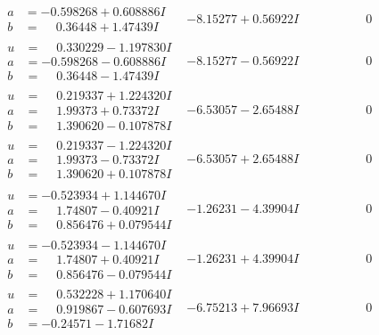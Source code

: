 \documentclass[1p]{elsarticle_modified}
\theoremstyle{definition}
\begin{document}
$$\begin{array}{c|c|c}
\begin{aligned}
a &= -0.598268 + 0.608886 I \\
b &= \phantom{-}0.36448 + 1.47439 I\end{aligned}
 & -8.15277 + 0.56922 I & \phantom{-0.000000 } 0 \\ \hline\begin{aligned}
u &= \phantom{-}0.330229 - 1.197830 I \\
a &= -0.598268 - 0.608886 I \\
b &= \phantom{-}0.36448 - 1.47439 I\end{aligned}
 & -8.15277 - 0.56922 I & \phantom{-0.000000 } 0 \\ \hline\begin{aligned}
u &= \phantom{-}0.219337 + 1.224320 I \\
a &= \phantom{-}1.99373 + 0.73372 I \\
b &= \phantom{-}1.390620 - 0.107878 I\end{aligned}
 & -6.53057 - 2.65488 I & \phantom{-0.000000 } 0 \\ \hline\begin{aligned}
u &= \phantom{-}0.219337 - 1.224320 I \\
a &= \phantom{-}1.99373 - 0.73372 I \\
b &= \phantom{-}1.390620 + 0.107878 I\end{aligned}
 & -6.53057 + 2.65488 I & \phantom{-0.000000 } 0 \\ \hline\begin{aligned}
u &= -0.523934 + 1.144670 I \\
a &= \phantom{-}1.74807 - 0.40921 I \\
b &= \phantom{-}0.856476 + 0.079544 I\end{aligned}
 & -1.26231 - 4.39904 I & \phantom{-0.000000 } 0 \\ \hline\begin{aligned}
u &= -0.523934 - 1.144670 I \\
a &= \phantom{-}1.74807 + 0.40921 I \\
b &= \phantom{-}0.856476 - 0.079544 I\end{aligned}
 & -1.26231 + 4.39904 I & \phantom{-0.000000 } 0 \\ \hline\begin{aligned}
u &= \phantom{-}0.532228 + 1.170640 I \\
a &= \phantom{-}0.919867 - 0.607693 I \\
b &= -0.24571 - 1.71682 I\end{aligned}
 & -6.75213 + 7.96693 I & \phantom{-0.000000 } 0 \\ \hline\begin{aligned}

\end{aligned}
\end{array}$$
\end{document}
